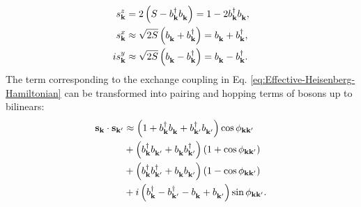 \documentclass[english,aps,prd,nofootinbib,twocolumn]{revtex4-1}
\begin{document}
\begin{equation}
\label{eq:Holstein-Primakoff}
\begin{split}
s_{\mathbf{k }}^{z} &= 2\left( S - 
b_{\mathbf{k }}^{\textcolor{black}{\dagger}}
b_{\mathbf{k }}^{\textcolor{white}{\dagger}} \right) = 1 - 2 
b_{\mathbf{k }}^{\textcolor{black}{\dagger}}
b_{\mathbf{k }}^{\textcolor{white}{\dagger}}
, \\
s_{\mathbf{k }}^{x}  
&\approx \sqrt{2 S}\left( 
b_{\mathbf{k }}^{\textcolor{white}{\dagger}} + 
b_{\mathbf{k }}^{\textcolor{black}{\dagger}} \right) = 
b_{\mathbf{k }}^{\textcolor{white}{\dagger}} + 
b_{\mathbf{k }}^{\textcolor{black}{\dagger}}
, \\
i s_{\mathbf{k }}^{y}
&\approx \sqrt{2 S}\left( 
b_{\mathbf{k }}^{\textcolor{white}{\dagger}} - 
b_{\mathbf{k }}^{\textcolor{black}{\dagger}} \right) = 
b_{\mathbf{k }}^{\textcolor{white}{\dagger}} - 
b_{\mathbf{k }}^{\textcolor{black}{\dagger}}
.
\end{split}
\end{equation}
The term corresponding to the exchange coupling in Eq. \eqref{eq:Effective-Heisenberg-Hamiltonian} can be transformed into pairing and hopping terms of bosons up to bilinears:
\begin{equation}
\begin{split}
\mathbf{s}_{\mathbf{k }} \cdot \mathbf{s}_{\mathbf{k'}} &\approx 
\left(
1+
b_{\mathbf{k }}^{\textcolor{black}{\dagger}}
b_{\mathbf{k }}^{\textcolor{white}{\dagger}} + b_{\mathbf{k'}}^{\textcolor{black}{\dagger}}b_{\mathbf{k'}}^{\textcolor{white}{\dagger}}\right)  
\cos \phi_{\mathbf{k }\mathbf{k'}}
\\ &+ 
\left(
b_{\mathbf{k }}^{\textcolor{black}{\dagger}}
b_{\mathbf{k'}}^{\textcolor{white}{\dagger}} + 
b_{\mathbf{k }}^{\textcolor{white}{\dagger}}
b_{\mathbf{k'}}^{\textcolor{black}{\dagger}}\right) 
\left( 1 + \cos \phi_{\mathbf{k }\mathbf{k'}} \right) 
\\ &+ 
 \left(
b_{\mathbf{k }}^{\textcolor{black}{\dagger}}
b_{\mathbf{k'}}^{\textcolor{black}{\dagger}} + 
b_{\mathbf{k }}^{\textcolor{white}{\dagger}}
b_{\mathbf{k'}}^{\textcolor{white}{\dagger}}
\right) 
\left( 1 - \cos \phi_{\mathbf{k }\mathbf{k'}} \right)
\\ &+ i
 \left(
b_{\mathbf{k }}^{\textcolor{black}{\dagger}} - 
b_{\mathbf{k'}}^{\textcolor{black}{\dagger}} - 
b_{\mathbf{k }}^{\textcolor{white}{\dagger}} +
b_{\mathbf{k'}}^{\textcolor{white}{\dagger}}
\right) 
\sin \phi_{\mathbf{k }\mathbf{k'}}.
\end{split}
\end{equation}
\end{document}
